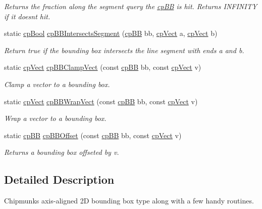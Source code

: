\begin{DoxyCompactItemize}
\begin{DoxyCompactList}\small\item\em Returns the fraction along the segment query the \hyperlink{structcp_b_b}{cp\+B\+B} is hit. Returns I\+N\+F\+I\+N\+I\+T\+Y if it doesn\textquotesingle{}t hit. \end{DoxyCompactList}\item 
\hypertarget{group__cp_b_b_b_ga65157a1d957e6069aef614dca588a705}{}static \hyperlink{group__basic_types_gabc5e752c48f3449ca26ef413ecbd647e}{cp\+Bool} \hyperlink{group__cp_b_b_b_ga65157a1d957e6069aef614dca588a705}{cp\+B\+B\+Intersects\+Segment} (\hyperlink{structcp_b_b}{cp\+B\+B} bb, \hyperlink{structcp_vect}{cp\+Vect} a, \hyperlink{structcp_vect}{cp\+Vect} b)\label{group__cp_b_b_b_ga65157a1d957e6069aef614dca588a705}

\begin{DoxyCompactList}\small\item\em Return true if the bounding box intersects the line segment with ends {\ttfamily a} and {\ttfamily b}. \end{DoxyCompactList}\item 
\hypertarget{group__cp_b_b_b_gac27ebb67e71268f471c2a4ad2658f23f}{}static \hyperlink{structcp_vect}{cp\+Vect} \hyperlink{group__cp_b_b_b_gac27ebb67e71268f471c2a4ad2658f23f}{cp\+B\+B\+Clamp\+Vect} (const \hyperlink{structcp_b_b}{cp\+B\+B} bb, const \hyperlink{structcp_vect}{cp\+Vect} v)\label{group__cp_b_b_b_gac27ebb67e71268f471c2a4ad2658f23f}

\begin{DoxyCompactList}\small\item\em Clamp a vector to a bounding box. \end{DoxyCompactList}\item 
\hypertarget{group__cp_b_b_b_ga0fbeae861bcd6e1ea09adeca277c5686}{}static \hyperlink{structcp_vect}{cp\+Vect} \hyperlink{group__cp_b_b_b_ga0fbeae861bcd6e1ea09adeca277c5686}{cp\+B\+B\+Wrap\+Vect} (const \hyperlink{structcp_b_b}{cp\+B\+B} bb, const \hyperlink{structcp_vect}{cp\+Vect} v)\label{group__cp_b_b_b_ga0fbeae861bcd6e1ea09adeca277c5686}

\begin{DoxyCompactList}\small\item\em Wrap a vector to a bounding box. \end{DoxyCompactList}\item 
\hypertarget{group__cp_b_b_b_ga37fcb8493c6e9175b0ec7fad10fd76ce}{}static \hyperlink{structcp_b_b}{cp\+B\+B} \hyperlink{group__cp_b_b_b_ga37fcb8493c6e9175b0ec7fad10fd76ce}{cp\+B\+B\+Offset} (const \hyperlink{structcp_b_b}{cp\+B\+B} bb, const \hyperlink{structcp_vect}{cp\+Vect} v)\label{group__cp_b_b_b_ga37fcb8493c6e9175b0ec7fad10fd76ce}

\begin{DoxyCompactList}\small\item\em Returns a bounding box offseted by {\ttfamily v}. \end{DoxyCompactList}\end{DoxyCompactItemize}


\subsection{Detailed Description}
Chipmunk\textquotesingle{}s axis-\/aligned 2\+D bounding box type along with a few handy routines. 

